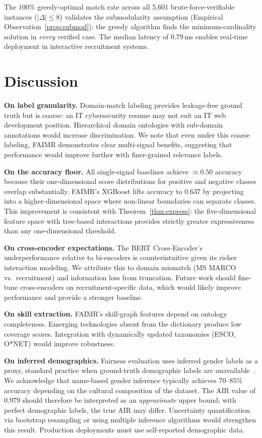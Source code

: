 \documentclass{svproc}
\begin{document}
The $100\%$ greedy-optimal match rate across all 5,601 brute-force-verifiable instances ($|\Delta| \leq 8$) validates the submodularity assumption (Empirical Observation~\ref{prop:submod}): the greedy algorithm finds the minimum-cardinality solution in \textit{every} verified case. The median latency of $0.79$\,ms enables real-time deployment in interactive recruitment systems.

\section{Discussion}\label{sec:discussion}

\textbf{On label granularity.} Domain-match labeling provides leakage-free ground truth but is coarse: an IT cybersecurity resume may not suit an IT web development position. Hierarchical domain ontologies with sub-domain annotations would increase discrimination. We note that even under this coarse labeling, FAIMR demonstrates clear multi-signal benefits, suggesting that performance would improve further with finer-grained relevance labels.

\textbf{On the accuracy floor.} All single-signal baselines achieve $\approx 0.50$ accuracy because their one-dimensional score distributions for positive and negative classes overlap substantially. FAIMR's XGBoost lifts accuracy to $0.637$ by projecting into a higher-dimensional space where non-linear boundaries can separate classes. This improvement is consistent with Theorem~\ref{thm:express}: the five-dimensional feature space with tree-based interactions provides strictly greater expressiveness than any one-dimensional threshold.

\textbf{On cross-encoder expectations.} The BERT Cross-Encoder's underperformance relative to bi-encoders is counterintuitive given its richer interaction modeling. We attribute this to domain mismatch (MS MARCO vs.\ recruitment) and information loss from truncation. Future work should fine-tune cross-encoders on recruitment-specific data, which would likely improve performance and provide a stronger baseline.

\textbf{On skill extraction.} FAIMR's skill-graph features depend on ontology completeness. Emerging technologies absent from the dictionary produce low coverage scores. Integration with dynamically updated taxonomies (ESCO, O*NET) would improve robustness.

\textbf{On inferred demographics.} Fairness evaluation uses inferred gender labels as a proxy, standard practice when ground-truth demographic labels are unavailable~\cite{buolamwini2018gender}. We acknowledge that name-based gender inference typically achieves 70--85\% accuracy depending on the cultural composition of the dataset. The AIR value of $0.979$ should therefore be interpreted as an \textit{approximate} upper bound; with perfect demographic labels, the true AIR may differ. Uncertainty quantification via bootstrap resampling or using multiple inference algorithms would strengthen this result. Production deployments must use self-reported demographic data.
\end{document}
